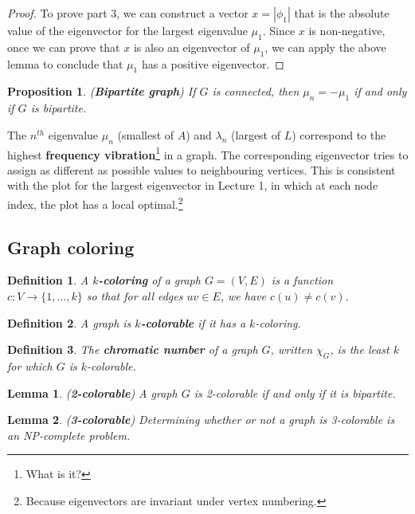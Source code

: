 \documentclass[]{article}
\newtheorem{lemma}{Lemma}[section]
\newtheorem{definition}{Definition}[section] %
\newtheorem{proposition}{Proposition}[section] %
\begin{document}
	\begin{proof}
		To prove part 3, we can construct a vector $x = |\phi_1|$ that is the absolute value of the eigenvector for the largest eigenvalue $\mu_1$. Since $x$ is non-negative, once we can prove that $x$ is also an eigenvector of $\mu_1$, we can apply the above lemma to conclude that $\mu_1$ has a positive eigenvector. 
	\end{proof}
	
	\begin{proposition} (\textbf{Bipartite graph})
		If $G$ is connected, then $\mu_n=-\mu_1$ if and only if $G$ is bipartite. 
	\end{proposition}
	
	The $n^{th}$ eigenvalue $\mu_n$ (smallest of $A$) and $\lambda_n$ (largest of $L$) correspond to the highest \textbf{frequency vibration}\footnote{What is it?} in a graph. The corresponding eigenvector tries to assign as different as possible values to neighbouring vertices. This is consistent with the plot for the largest eigenvector in Lecture 1, in which at each node index, the plot has a local optimal.\footnote{Because eigenvectors are invariant under vertex numbering.} 
	
	
	\subsection{Graph coloring}
	
	\begin{definition}
		A \textbf{$k$-coloring} of a graph $G=(V,E)$ is a function $c: V \rightarrow \{1, \dots, k\}$ so that for all edges $uv \in E$, we have $c(u) \neq c(v)$. 
	\end{definition}
	
	\begin{definition}
		A graph is \textbf{$k$-colorable} if it has a $k$-coloring. 
	\end{definition}
	
	\begin{definition}
		The \textbf{chromatic number} of a graph $G$, written $\chi_G$, is the least $k$ for which $G$ is $k$-colorable. 
	\end{definition}
	
	\begin{lemma} (\textbf{2-colorable})
		A graph $G$ is 2-colorable if and only if it is bipartite. 
	\end{lemma}
	
	\begin{lemma} (\textbf{3-colorable})
		Determining whether or not a graph is 3-colorable is an NP-complete problem. 
	\end{lemma}
	
\end{document}
